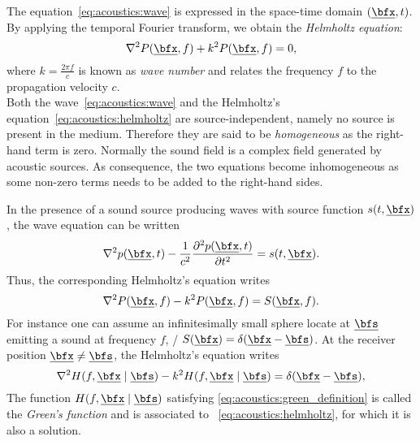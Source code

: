 The equation~\ref{eq:acoustics:wave} is expressed in the space-time domain $\depSpaceTime$.
By applying the temporal Fourier transform, we obtain the \textit{Helmholtz equation}:
\begin{equation}
    \label{eq:acoustics:helmholtz}
    \knabla^2 P(\positionMicrophone, f) + k^2 P(\positionMicrophone, f) = 0
    ,
\end{equation}
where $k = \frac{2 \pi f}{c}$  is known as \textit{wave number} and relates the frequency $f$ to the propagation velocity $c$.
\\Both the wave~\eqref{eq:acoustics:wave} and the Helmholtz's equation~\eqref{eq:acoustics:helmholtz} are source-independent, namely no source is present in the medium.
Therefore they are said to be \textit{homogeneous} as the right-hand term is zero.
Normally the sound field is a complex field generated by acoustic sources.
As consequence, the two equations become inhomogeneous as some non-zero terms needs to be added to the right-hand sides.

\mynewline
In the presence of a sound source producing waves with source function $s(t, \positionMicrophone)$, the wave equation can be written
\begin{equation}
    \label{eq:acoustics:source}
    \knabla^2 \pressureSpaceTime - \frac{1}{\speedOfSound^2} \kpderiv[2]{\pressureSpaceTime}{t} = s(t, \positionMicrophone)
    .
\end{equation}
Thus, the corresponding Helmholtz's equation writes
\begin{equation}
    \label{eq:acoustics:source_freq}
    \knabla^2 P(\positionMicrophone, f) - k^2 P(\positionMicrophone, f) = S(\positionMicrophone, f)
    .
\end{equation}
For instance one can assume an infinitesimally small sphere locate at $\positionSource$ emitting a sound at frequency $f$,
\ie/ $S(\positionMicrophone) = \delta(\positionMicrophone - \positionSource)$.
At the receiver position $\positionMicrophone \neq \positionSource$, the Helmholtz's equation writes
\begin{equation}
    \label{eq:acoustics:green_definition}
    \knabla^2 H(f, \positionMicrophone \mid \positionSource)
        - k^2 H(f, \positionMicrophone \mid \positionSource)
        = \delta(\positionMicrophone - \positionSource)
    ,
\end{equation}
The function $H(f, \positionMicrophone \mid \positionSource)$ satisfying \cref{eq:acoustics:green_definition} is called the \textit{Green's function} and is
associated to ~\cref{eq:acoustics:helmholtz}, for which it is also a solution.

